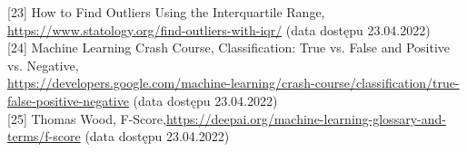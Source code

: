 \documentclass[a4paper,12pt,oneside]{book}
\begin{document}
[23] How to Find Outliers Using the Interquartile Range, \url{https://www.statology.org/find-outliers-with-iqr/} (data dostępu 23.04.2022)\\

[24] Machine Learning Crash Course, Classification: True vs. False and Positive vs. Negative,\\
\url{https://developers.google.com/machine-learning/crash-course/classification/true-false-positive-negative} (data dostępu 23.04.2022)\\

[25] Thomas Wood, F-Score,\newline \url{https://deepai.org/machine-learning-glossary-and-terms/f-score} (data dostępu 23.04.2022)\\
\end{document}
